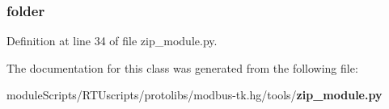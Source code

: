\subsubsection[{folder}]{\setlength{\rightskip}{0pt plus 5cm}folder}\label{classzip__module_1_1_zip_archive_a813d56590d96553d6f8ce1fff3ab52f6}


Definition at line 34 of file zip\+\_\+module.\+py.



The documentation for this class was generated from the following file\+:\begin{DoxyCompactItemize}
\item 
module\+Scripts/\+R\+T\+Uscripts/protolibs/modbus-\/tk.\+hg/tools/{\bf zip\+\_\+module.\+py}\end{DoxyCompactItemize}
